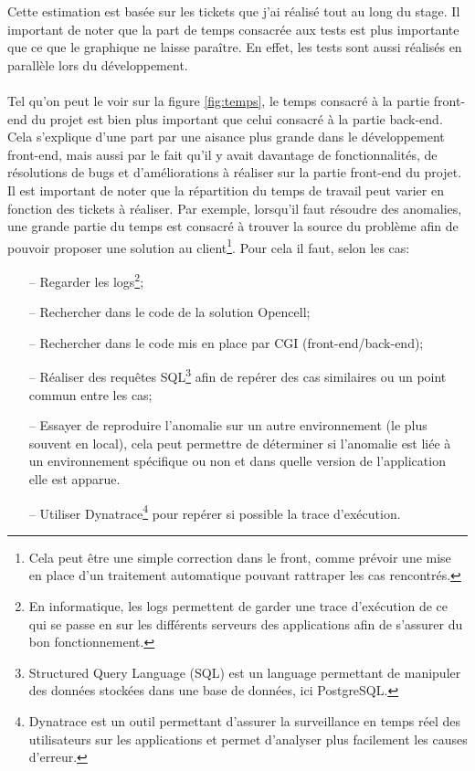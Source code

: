 \documentclass[12pt, a4paper]{report}
\begin{document}
	\noindent
	Cette estimation est basée sur les tickets que j'ai réalisé tout au long du stage. Il important de noter que la part de temps consacrée aux tests est plus importante que ce que le graphique ne laisse paraître. En effet, les tests sont aussi réalisés en parallèle lors du développement.
	\\\\
	Tel qu'on peut le voir sur la figure \ref{fig:temps}, le temps consacré à la partie front-end du projet est bien plus important que celui consacré à la partie back-end. Cela s'explique d'une part par une aisance plus grande dans le développement front-end, mais aussi par le fait qu'il y avait davantage de fonctionnalités, de résolutions de bugs et d'améliorations à réaliser sur la partie front-end du projet.
	\newpage\noindent
	Il est important de noter que la répartition du temps de travail peut varier en fonction des tickets à réaliser. Par exemple, lorsqu'il faut résoudre des anomalies, une grande partie du temps est consacré à trouver la source du problème afin de pouvoir proposer une solution au client\footnote{Cela peut être une simple correction dans le front, comme prévoir une mise en place d'un traitement automatique pouvant rattraper les cas rencontrés.}. Pour cela il faut, selon les cas:
	\\
	\begin{itemize}
		\item[–] Regarder les logs\footnote{En informatique, les logs permettent de garder une trace d'exécution de ce qui se passe en sur les différents serveurs des applications afin de s'assurer du bon fonctionnement.};
		\item[–] Rechercher dans le code de la solution Opencell;
		\item[–] Rechercher dans le code mis en place par CGI (front-end/back-end);
		\item[–] Réaliser des requêtes SQL\footnote{Structured Query Language (SQL) est un language permettant de manipuler des données stockées dans une base de données, ici PostgreSQL.} afin de repérer des cas similaires ou un point commun entre les cas;
		\item[–] Essayer de reproduire l'anomalie sur un autre environnement (le plus souvent en local), cela peut permettre de déterminer si l'anomalie est liée à un environnement spécifique ou non et dans quelle version de l'application elle est apparue.
		\item[–] Utiliser Dynatrace\footnote{Dynatrace est un outil permettant d'assurer la surveillance en temps réel des utilisateurs sur les applications et permet d'analyser plus facilement les causes d'erreur.} pour repérer si possible la trace d'exécution.\\
	\end{itemize}
\end{document}
